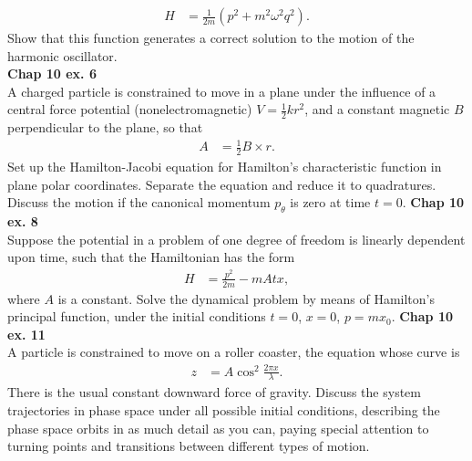\documentclass[10pt]{article}
\begin{document}
\begin{align*}
  H &= \frac{1}{2m}\left( p^2+m^2\omega^2q^2 \right).
\end{align*}
Show that this function generates a correct solution to the motion of the 
harmonic oscillator.\\
\textbf{Chap 10 ex. 6}\\
A charged particle is constrained to move in a plane under the influence of
a central force potential (nonelectromagnetic) $V=\frac{1}{2}kr^2$, and a 
constant magnetic $B$ perpendicular to the plane, so that
\begin{align*}
  A &= \frac{1}{2}B\times r.
\end{align*}
Set up the Hamilton-Jacobi equation for Hamilton's characteristic function
in plane polar coordinates.  Separate the equation and reduce it to
quadratures.  Discuss the motion if the canonical momentum $p_{\theta}$ is
zero at time $t=0$.
\textbf{Chap 10 ex. 8}\\
Suppose the potential in a problem of one degree of freedom is linearly
dependent upon time, such that the Hamiltonian has the form
\begin{align*}
  H &= \frac{p^2}{2m}-mAtx,
\end{align*}
where $A$ is a constant.  Solve the dynamical problem by means of
Hamilton's principal function, under the initial conditions $t=0$, $x=0$,
$p=mx_0$.
\textbf{Chap 10 ex. 11}\\
A particle is constrained to move on a roller coaster, the equation whose
curve is 
\begin{align*}
  z &= A\cos^2\frac{2\pi x}{\lambda}.
\end{align*}
There is the usual constant downward force of gravity. Discuss the system
trajectories in phase space under all possible initial conditions,
describing the phase space orbits in as much detail as you can, paying
special attention to turning points and transitions between different types
of motion.
\end{document}
